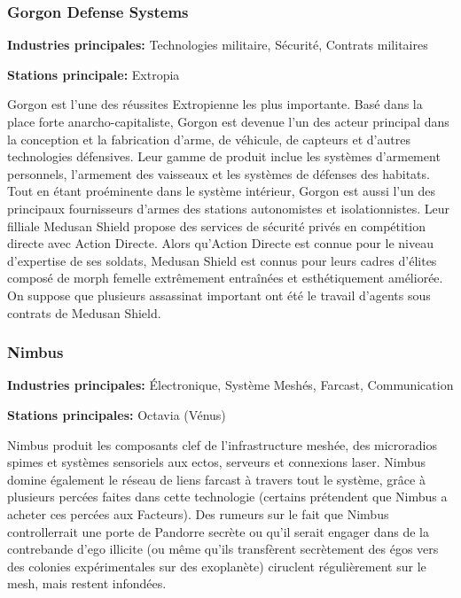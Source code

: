 \subsubsection{Gorgon Defense Systems} \label{sec:gorg-defense-syst} 

\textbf{Industries principales:} Technologies militaire, Sécurité, Contrats militaires 

\textbf{Stations principale:} Extropia 

Gorgon est l'une des réussites Extropienne les plus importante. Basé dans la place forte anarcho-capitaliste, Gorgon est devenue l'un des acteur principal dans la conception et la fabrication d'arme, de véhicule, de capteurs et d'autres technologies défensives. Leur gamme de produit inclue les systèmes d'armement personnels, l'armement des vaisseaux et les systèmes de défenses des habitats. Tout en étant proéminente dans le système intérieur, Gorgon est aussi l'un des principaux fournisseurs d'armes des stations autonomistes et isolationnistes. Leur filliale Medusan Shield propose des services de sécurité privés en compétition directe avec Action Directe. Alors qu'Action Directe est connue pour le niveau d'expertise de ses soldats, Medusan Shield est connus pour leurs cadres d'élites composé de morph femelle extrêmement entraînées et esthétiquement améliorée. On suppose que plusieurs assassinat important ont été le travail d'agents sous contrats de Medusan Shield. 

\subsubsection{Nimbus} \label{sec:nimbus} 

\textbf{Industries principales:} Électronique, Système Meshés, Farcast, Communication 

\textbf{Stations principales:} Octavia (Vénus) 

Nimbus produit les composants clef de l'infrastructure meshée, des microradios spimes et systèmes sensoriels aux ectos, serveurs et connexions laser. Nimbus domine également le réseau de liens farcast à travers tout le système, grâce à plusieurs percées faites dans cette technologie (certains prétendent que Nimbus a acheter ces percées aux Facteurs). Des rumeurs sur le fait que Nimbus controllerrait une porte de Pandorre secrète ou qu'il serait engager dans de la contrebande d'ego illicite (ou même qu'ils transfèrent secrètement des égos vers des colonies expérimentales sur des exoplanète) ciruclent régulièrement sur le mesh, mais restent infondées. 

